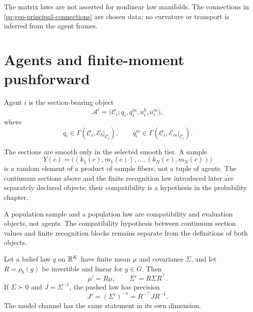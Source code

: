 The matrix laws are not asserted for nonlinear law manifolds. The connections
in \eqref{eq:geo-principal-connections} are chosen data; no curvature or
transport is inferred from the agent frames. 

\section{Agents and finite-moment pushforward}
\label{sec:geo-agents}

Agent $i$ is the section-bearing object
\begin{equation}
\mathcal A^i=\bigl(\mathcal C_i;q_i,q_i^m,u_i^b,u_i^m\bigr),
\label{eq:geo-agent-object}
\end{equation}
where
\begin{equation}
q_i\in\Gamma(\mathcal C_i,\mathcal E_b|_{\mathcal C_i}),
\qquad
q_i^m\in\Gamma(\mathcal C_i,\mathcal E_m|_{\mathcal C_i}).
\label{eq:geo-agent-sections}
\end{equation}

The sections are smooth only in the selected smooth tier.  A sample
\begin{equation}
Y(c)=\bigl((k_1(c),m_1(c)),\ldots,(k_N(c),m_N(c))\bigr)
\label{eq:geo-population-sample}
\end{equation}
is a random element of a product of sample fibers, not a tuple of agents.  The continuum sections
above and the finite recognition law introduced later are separately declared objects; their
compatibility is a hypothesis in the probability chapter.

A population sample and a population law are compatibility and evaluation objects, not agents.
The compatibility hypothesis between continuum section values and finite recognition blocks remains
separate from the definitions of both objects. 

Let a belief law $q$ on $\mathbb R^K$ have finite mean $\mu$ and covariance $\Sigma$, and let
$R=\rho_b(g)$ be invertible and linear for $g\in G$. Then
\begin{equation}
\mu'=R\mu,
\qquad
\Sigma'=R\Sigma R^\top.
\label{eq:geo-moment-pushforward}
\end{equation}
If $\Sigma\succ0$ and $J=\Sigma^{-1}$, the pushed law has precision
\begin{equation}
J'=(\Sigma')^{-1}=R^{-\top}JR^{-1}.
\label{eq:geo-precision-inverse-congruence}
\end{equation}
The model channel has the same statement in its own dimension. 

